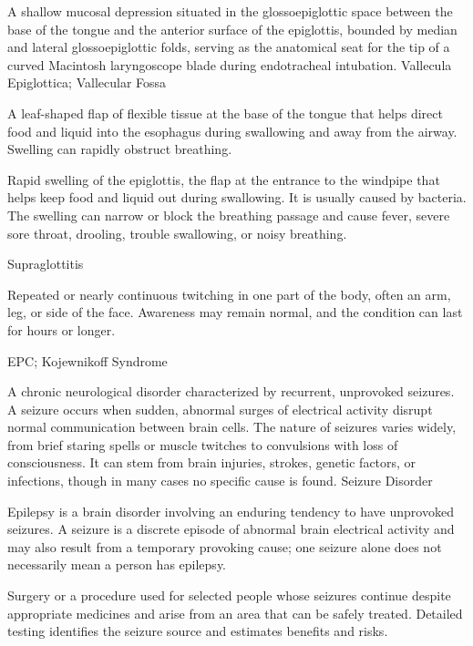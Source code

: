  A shallow mucosal depression situated in the glossoepiglottic space between the base of the tongue and the anterior surface of the epiglottis, bounded by median and lateral glossoepiglottic folds, serving as the anatomical seat for the tip of a curved Macintosh laryngoscope blade during endotracheal intubation.
\synonyms
Vallecula Epiglottica; Vallecular Fossa

 A leaf-shaped flap of flexible tissue at the base of the tongue that helps direct food and liquid into the esophagus during swallowing and away from the airway. Swelling can rapidly obstruct breathing.

 Rapid swelling of the epiglottis, the flap at the entrance to the windpipe that helps keep food and liquid out during swallowing. It is usually caused by bacteria. The swelling can narrow or block the breathing passage and cause fever, severe sore throat, drooling, trouble swallowing, or noisy breathing.

\synonyms
Supraglottitis

 Repeated or nearly continuous twitching in one part of the body, often an arm, leg, or side of the face. Awareness may remain normal, and the condition can last for hours or longer.

\synonyms
EPC; Kojewnikoff Syndrome

 A chronic neurological disorder characterized by recurrent, unprovoked seizures. A seizure occurs when sudden, abnormal surges of electrical activity disrupt normal communication between brain cells. The nature of seizures varies widely, from brief staring spells or muscle twitches to convulsions with loss of consciousness. It can stem from brain injuries, strokes, genetic factors, or infections, though in many cases no specific cause is found.
\synonyms
Seizure Disorder

 Epilepsy is a brain disorder involving an enduring tendency to have unprovoked seizures. A seizure is a discrete episode of abnormal brain electrical activity and may also result from a temporary provoking cause; one seizure alone does not necessarily mean a person has epilepsy.

 Surgery or a procedure used for selected people whose seizures continue despite appropriate medicines and arise from an area that can be safely treated. Detailed testing identifies the seizure source and estimates benefits and risks.

